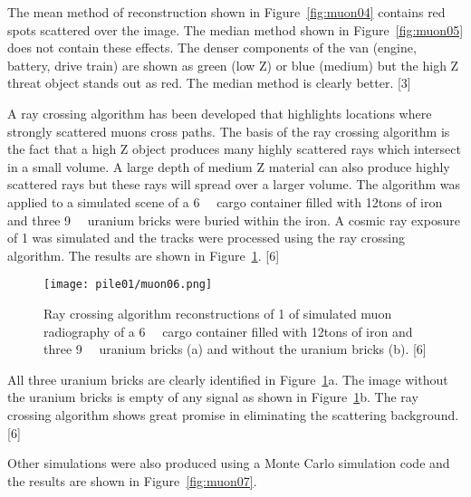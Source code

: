 \documentclass[twoside,titlepage,11pt,twocolumn,a4paper]{article}
\begin{document}
The mean method of reconstruction shown in Figure~\ref{fig:muon04}
contains red spots scattered over the image.  The median method shown
in Figure~\ref{fig:muon05} does not contain these effects. The denser
components of the van (engine, battery, drive train) are shown as
green (low Z) or blue (medium) but the high Z threat object stands out
as red. The median method is clearly better. [3]

A ray crossing algorithm has been developed that highlights locations
where strongly scattered muons cross paths. The basis of the ray
crossing algorithm is the fact that a high Z object produces many
highly scattered rays which intersect in a small volume. A large depth
of medium Z material can also produce highly scattered rays but these
rays will spread over a larger volume. The algorithm was applied to a
simulated scene of a \unit{6}{\cubic\metre} cargo
container filled with \unit{12}{tons} of iron and three
\unit{9}{\cubic{\centi\metre}} uranium bricks were
buried within the iron. A cosmic ray exposure of \unit{1}{\minute} was
simulated and the tracks were processed using the ray crossing
algorithm. The results are shown in Figure~\ref{fig:muon06}. [6]

\begin{figure}
  \texttt{[image: pile01/muon06.png]}
  \caption{Ray crossing algorithm reconstructions of \unit{1}{\minute}
    of simulated muon radiography of a
    \unit{6}{\cubic\metre} cargo container filled
    with \unit{12}{tons} of iron and three
    \unit{9}{\cubic{\centi\metre}} uranium bricks (a)
    and without the uranium bricks (b). [6]}
  \label{fig:muon06}
\end{figure}

All three uranium bricks are clearly identified in
Figure~\ref{fig:muon06}a. The image without the uranium bricks is empty of
any signal as shown in Figure~\ref{fig:muon06}b. The ray crossing
algorithm shows great promise in eliminating the scattering
background. [6]

Other simulations were also produced using a Monte Carlo simulation
code and the results are shown in Figure~\ref{fig:muon07}.
\end{document}
